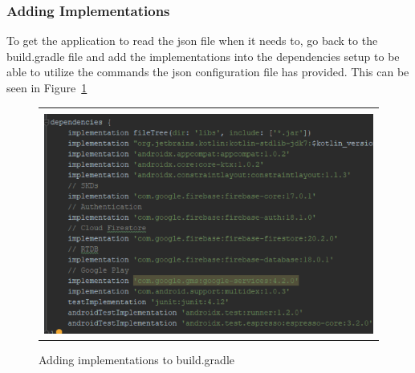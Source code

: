 \documentclass[conference]{IEEEtran}
\begin{document}
\subsubsection{Adding Implementations}
To get the application to read the json file when it needs to, go back to the build.gradle file and add the implementations into the dependencies setup to be able to utilize the commands the json configuration file has provided.  This can be seen in Figure~\ref{fig:Step3}
\begin{figure}[h] %
\begin{tabular}{| p{}|}
\hline
\\
\begin{center} \includegraphics[scale=.6]{../graphics/Step3.png} \end{center}\\
\hline
\end{tabular}	
	\caption{Adding implementations to build.gradle}
	\label{fig:Step3}
\end{figure} 
\end{document}
